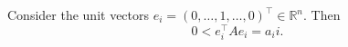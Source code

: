 {
\color{solution}
Consider the unit vectors $e_i = (0,\ldots, 1, \ldots, 0)^\top \in \mathbb{R}^n$. Then
$$0 < e_i^\top A e_i = a_ii. $$
}
